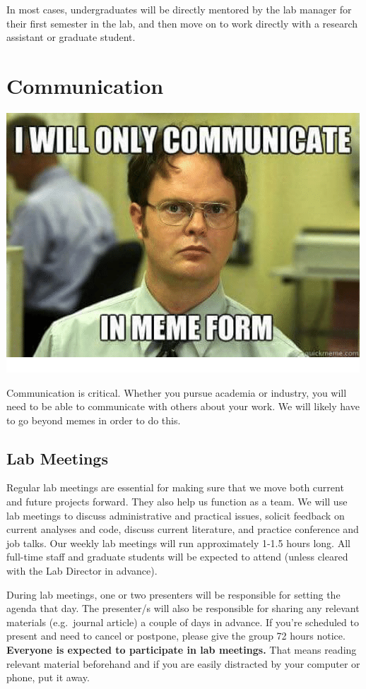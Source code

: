 \documentclass[]{book}
\begin{document}
In most cases, undergraduates will be directly mentored by the lab manager for their first semester in the lab, and then move on to work directly with a research assistant or graduate student.

\hypertarget{communication}{%
\chapter{Communication}\label{communication}}

\includegraphics{images/communication.png}

Communication is critical. Whether you pursue academia or industry, you will need to be able to communicate with others about your work. We will likely have to go beyond memes in order to do this.

\hypertarget{lab-meetings}{%
\section{Lab Meetings}\label{lab-meetings}}

Regular lab meetings are essential for making sure that we move both current and future projects forward. They also help us function as a team. We will use lab meetings to discuss administrative and practical issues, solicit feedback on current analyses and code, discuss current literature, and practice conference and job talks. Our weekly lab meetings will run approximately 1-1.5 hours long. All full-time staff and graduate students will be expected to attend (unless cleared with the Lab Director in advance).

During lab meetings, one or two presenters will be responsible for setting the agenda that day. The presenter/s will also be responsible for sharing any relevant materials (e.g.~journal article) a couple of days in advance. If you're scheduled to present and need to cancel or postpone, please give the group 72 hours notice. \textbf{Everyone is expected to participate in lab meetings.} That means reading relevant material beforehand and if you are easily distracted by your computer or phone, put it away.
\end{document}
